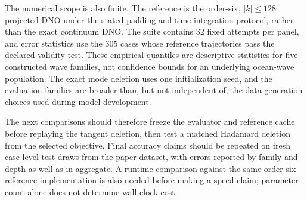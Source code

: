 The numerical scope is also finite.  The reference is the order-six,
$|k|\leq128$ projected DNO under the stated padding and time-integration
protocol, rather than the exact continuum DNO\@.  The suite contains 32 fixed
attempts per panel, and error statistics use the 305 cases whose reference
trajectories pass the declared validity test.  These empirical quantiles are
descriptive statistics for five constructed wave families, not confidence
bounds for an underlying ocean-wave population.  The exact mode deletion uses
one initialization seed, and the evaluation families are broader than, but
not independent of, the data-generation choices used during model
development.

The next comparisons should therefore freeze the evaluator and reference
cache before replaying the tangent deletion, then test a matched Hadamard
deletion from the selected objective.  Final accuracy claims should be
repeated on fresh case-level test draws from the paper dataset, with errors
reported by family and depth as well as in aggregate.  A runtime comparison
against the same order-six reference implementation is also needed before
making a speed claim; parameter count alone does not determine wall-clock
cost.
